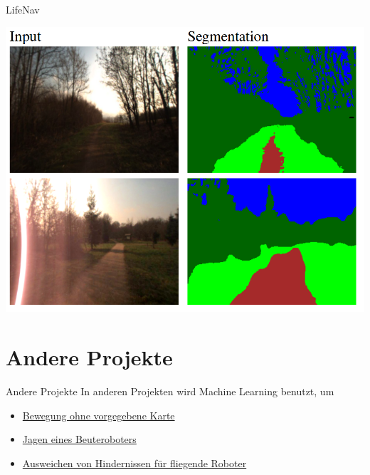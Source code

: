 \documentclass[aspectratio=1610]{beamer}
\begin{document}
  \begin{frame}{LifeNav}
  	\begin{center}
  		\includegraphics[scale=0.26]{img/segmentation.png}
  	\end{center}
  \end{frame}
  
  \section{Andere Projekte}
  \begin{frame}{Andere Projekte}
  	In anderen Projekten wird Machine Learning benutzt, um
  	\begin{itemize}
  		\item \href{https://youtu.be/9AOIwBYIBbs?t=70}{Bewegung ohne vorgegebene Karte}
  		\item \href{https://www.youtube.com/watch?v=fL3YCIPxuhM&feature=youtu.be}{Jagen eines Beuteroboters}
  		\item \href{https://youtu.be/hNsP6-K3Hn4?t=40}{Ausweichen von Hindernissen für fliegende Roboter}
  	\end{itemize}
  \end{frame}
  
\end{document}
